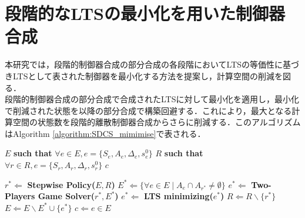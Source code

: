 \documentclass[technicalreport]{ieicej}
\begin{document}
\section{段階的なLTSの最小化を用いた制御器合成}
本研究では，段階的制御器合成の部分合成の各段階においてLTSの等価性に基づきLTSとして表された制御器を最小化する方法を提案し，計算空間の削減を図る．\\
\indent
段階的制御器合成の部分合成で合成されたLTSに対して最小化を適用し，最小化で削減された状態を以降の部分合成で構築回避する．これにより，最大となる計算空間の状態数を段階的離散制御器合成からさらに削減する．このアルゴリズムはAlgorithm \ref{algorithm:SDCS_mimimise}で表される．
\begin{algorithm}[t]
  \caption{LTSの最小化をする段階的離散制御器合成}
  \label{algorithm:SDCS_mimimise}
  \begin{algorithmic}[1]
  \renewcommand{\algorithmicrequire}{\textbf{Input:}}
  \renewcommand{\algorithmicensure}{\textbf{Output:}}
  \REQUIRE $E$ {\bf such that} $\forall e \in E, e = \{S_{e}, A_{e}, \Delta_{e}, s^0_{e}\}$
  \REQUIRE $R$ {\bf such that} $\forall r \in R, e = \{S_{r}, A_{r}, \Delta_{r}, s^0_{r}\}$
  \ENSURE  $c$
  
    \STATE $r^* \Leftarrow $ {\bf Stepwise Policy($E,R$)}
    \STATE $E^* \Leftarrow \{\forall e \in E \mid A_e \cap A_{r^*} \neq \emptyset\}$
    \STATE $e^* \Leftarrow $ {\bf Two-Players Game Solver($r^*,E^*$)}
    \STATE $e^* \Leftarrow $ {\bf LTS minimizing($e^*$)}
    \STATE $R \Leftarrow R \backslash \{r^*\}$
    \STATE $E \Leftarrow E \backslash E^* \cup \{e^*\}$
  \ENDFOR
   $c \Leftarrow e \in E$
  \end{algorithmic}
  \end{algorithm}
\end{document}
